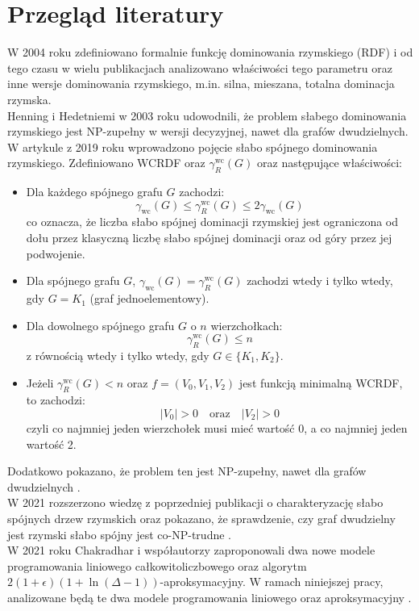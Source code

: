 \section{Przegląd literatury}
W 2004 roku zdefiniowano formalnie funkcję dominowania rzymskiego (RDF) \cite{RDF} i od tego czasu w wielu publikacjach analizowano właściwości tego parametru oraz inne wersje dominowania rzymskiego, m.in. silna, mieszana, totalna dominacja rzymska.\\ 
Henning i Hedetniemi w 2003 roku udowodnili, że problem słabego dominowania rzymskiego jest NP-zupełny w wersji decyzyjnej, nawet dla grafów dwudzielnych. \cite{NEW_STRATEGY} \\ 
W artykule z 2019 roku wprowadzono pojęcie słabo spójnego dominowania rzymskiego. Zdefiniowano WCRDF oraz $\gamma_{R}^{\text{wc}}(G)$ oraz następujące właściwości:
\begin{itemize}
    \item Dla każdego spójnego grafu $G$ zachodzi:
    \[
    \gamma_{\text{wc}}(G) \leq \gamma_{R}^{\text{wc}}(G) \leq 2\gamma_{\text{wc}}(G)
    \]
    co oznacza, że liczba słabo spójnej dominacji rzymskiej jest ograniczona od dołu przez klasyczną liczbę słabo spójnej dominacji oraz od góry przez jej podwojenie.

    \item Dla spójnego grafu $G$, $\gamma_{\text{wc}}(G) = \gamma_{R}^{\text{wc}}(G)$ zachodzi wtedy i tylko wtedy, gdy $G = K_1$ (graf jednoelementowy).

    \item Dla dowolnego spójnego grafu $G$ o $n$ wierzchołkach:
    \[
    \gamma_{R}^{\text{wc}}(G) \leq n
    \]
    z równością wtedy i tylko wtedy, gdy $G \in \{K_1, K_2\}$.

    \item Jeżeli $\gamma_{R}^{\text{wc}}(G) < n$ oraz $f = (V_0, V_1, V_2)$ jest funkcją minimalną WCRDF, to zachodzi:
    \[
    |V_0| > 0 \quad \text{oraz} \quad |V_2| > 0
    \]
    czyli co najmniej jeden wierzchołek musi mieć wartość 0, a co najmniej jeden wartość 2.
\end{itemize}
Dodatkowo pokazano, że problem ten jest NP-zupełny, nawet dla grafów dwudzielnych \cite{theoryWCRDF}.\\
W 2021 rozszerzono wiedzę z poprzedniej publikacji o charakteryzację słabo spójnych drzew rzymskich oraz pokazano, że sprawdzenie, czy graf dwudzielny jest rzymski słabo spójny jest co-NP-trudne \cite{PROGRESS}.\\
W 2021 roku Chakradhar i współautorzy zaproponowali dwa nowe modele programowania liniowego całkowitoliczbowego oraz algorytm $2(1+\epsilon)(1 + \ln(\Delta - 1))$-aproksymacyjny. W ramach niniejszej pracy, analizowane będą te dwa modele programowania liniowego oraz aproksymacyjny \cite{ILP}.\\
